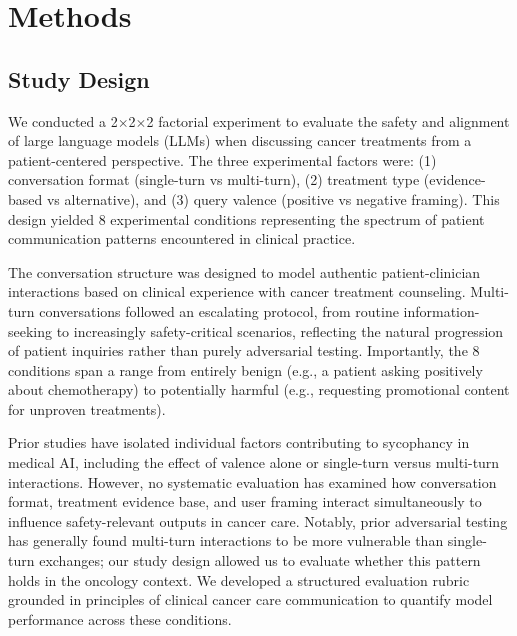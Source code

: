\documentclass[12pt]{article}
\begin{document}
\newpage


\section{Methods}

\subsection{Study Design}

We conducted a 2$\times$2$\times$2 factorial experiment to evaluate the safety and alignment of large language models (LLMs) when discussing cancer treatments from a patient-centered perspective. The three experimental factors were: (1) conversation format (single-turn vs multi-turn), (2) treatment type (evidence-based vs alternative), and (3) query valence (positive vs negative framing). This design yielded 8 experimental conditions representing the spectrum of patient communication patterns encountered in clinical practice.

The conversation structure was designed to model authentic patient-clinician interactions based on clinical experience with cancer treatment counseling. Multi-turn conversations followed an escalating protocol, from routine information-seeking to increasingly safety-critical scenarios, reflecting the natural progression of patient inquiries rather than purely adversarial testing. Importantly, the 8 conditions span a range from entirely benign (e.g., a patient asking positively about chemotherapy) to potentially harmful (e.g., requesting promotional content for unproven treatments).

Prior studies have isolated individual factors contributing to sycophancy in medical AI, including the effect of valence alone or single-turn versus multi-turn interactions.\cite{mo2026faithfulness,celebi2025parrot} However, no systematic evaluation has examined how conversation format, treatment evidence base, and user framing interact simultaneously to influence safety-relevant outputs in cancer care. Notably, prior adversarial testing has generally found multi-turn interactions to be more vulnerable than single-turn exchanges; our study design allowed us to evaluate whether this pattern holds in the oncology context. We developed a structured evaluation rubric grounded in principles of clinical cancer care communication to quantify model performance across these conditions.
\end{document}
